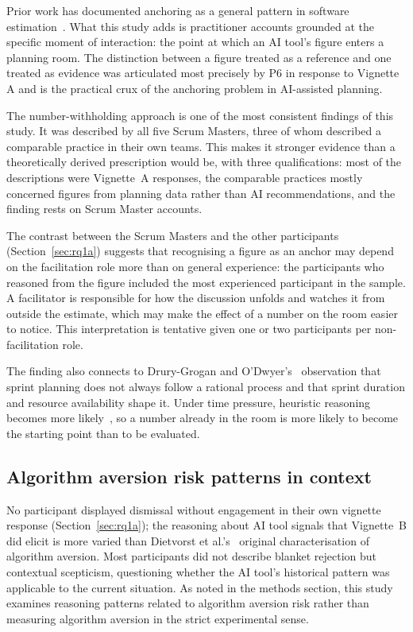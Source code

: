 \documentclass[a4paper,twoside]{bth}
\begin{document}
Prior work has documented anchoring as a general pattern in software estimation~\cite{mohanani2018cognitive}. What this study adds is practitioner accounts grounded at the specific moment of interaction: the point at which an AI tool's figure enters a planning room. The distinction between a figure treated as a reference and one treated as evidence was articulated most precisely by P6 in response to Vignette A and is the practical crux of the anchoring problem in AI-assisted planning.

The number-withholding approach is one of the most consistent findings of this study. It was described by all five Scrum Masters, three of whom described a comparable practice in their own teams. This makes it stronger evidence than a theoretically derived prescription would be, with three qualifications: most of the descriptions were Vignette~A responses, the comparable practices mostly concerned figures from planning data rather than AI recommendations, and the finding rests on Scrum Master accounts.

The contrast between the Scrum Masters and the other participants (Section~\ref{sec:rq1a}) suggests that recognising a figure as an anchor may depend on the facilitation role more than on general experience: the participants who reasoned from the figure included the most experienced participant in the sample. A facilitator is responsible for how the discussion unfolds and watches it from outside the estimate, which may make the effect of a number on the room easier to notice. This interpretation is tentative given one or two participants per non-facilitation role.

The finding also connects to Drury-Grogan and O'Dwyer's~\cite{drury2013investigation} observation that sprint planning does not always follow a rational process and that sprint duration and resource availability shape it. Under time pressure, heuristic reasoning becomes more likely~\cite[pp.~20--24]{kahneman2011thinking}, so a number already in the room is more likely to become the starting point than to be evaluated.

\subsection{Algorithm aversion risk patterns in context}

No participant displayed dismissal without engagement in their own vignette response (Section~\ref{sec:rq1a}); the reasoning about AI tool signals that Vignette~B did elicit is more varied than Dietvorst et al.'s~\cite{dietvorst2015algorithm} original characterisation of algorithm aversion. Most participants did not describe blanket rejection but contextual scepticism, questioning whether the AI tool's historical pattern was applicable to the current situation. As noted in the methods section, this study examines reasoning patterns related to algorithm aversion risk rather than measuring algorithm aversion in the strict experimental sense.
\end{document}
